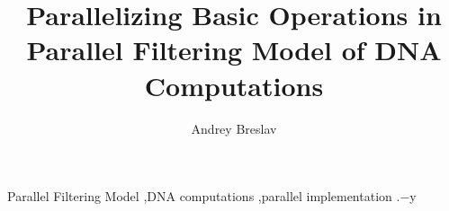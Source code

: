 \documentclass{article}
\begin{document}
\begin{frontmatter}

\title{Parallelizing Basic Operations in Parallel Filtering Model of DNA Computations}

\author{Andrey Breslav}
\address{SPbSU ITMO, 49, Kronverskiy pr, St. Petersburg, 197101, Russia}

\begin{abstract}

\end{abstract}

\begin{keyword}
Parallel Filtering Model \sep DNA computations \sep parallel implementation
.$-$y
\end{keyword}
\end{frontmatter}

\thispagestyle{empty}

\pagestyle{plain}
\setcounter{page}{1}











\end{document}
